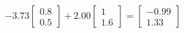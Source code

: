 \documentclass[preview]{standalone}
\begin{document}
\begin{align*}
-3.73 \begin{bmatrix} 0.8 \\ 0.5 \end{bmatrix} + 2.00 \begin{bmatrix} 1 \\ 1.6 \end{bmatrix} = \begin{bmatrix} -0.99 \\ 1.33 \end{bmatrix}
\end{align*}
\end{document}
